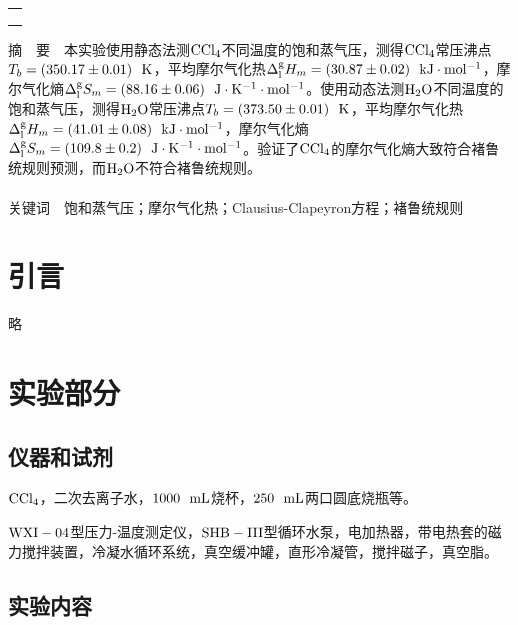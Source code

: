 \documentclass[12pt]{article}
\begin{document}
\begin{titlepage}
\begin{center}
            \begin{tabular*}{\textwidth}{c}
                \\ %
                \\ %
                \\ %
                \\ %
                \hline %
            \end{tabular*}
        \end{center}
        \textsf{摘\ \ 要}\ \ 本实验使用静态法测$\rm CCl_{4}$不同温度的饱和蒸气压，测得$\rm CCl_{4}$常压沸点$T_{b}=(350.17\pm 0.01)\ \ {\rm K}$，平均摩尔气化热$\Delta^{\rm g}_{\rm l}H_{m}=(30.87\pm 0.02)\ \ {\rm kJ\cdot mol^{-1}}$，摩尔气化熵$\Delta^{\rm g}_{\rm l}S_{m}=(88.16\pm 0.06)\ \ {\rm J\cdot K^{-1}\cdot mol^{-1}}$。使用动态法测$\rm H_{2}O$不同温度的饱和蒸气压，测得$\rm H_{2}O$常压沸点$T_{b}=(373.50\pm 0.01)\ \ {\rm K}$，平均摩尔气化热$\Delta^{\rm g}_{\rm l}H_{m}=(41.01\pm 0.08)\ \ {\rm kJ\cdot mol^{-1}}$，摩尔气化熵$\Delta^{\rm g}_{\rm l}S_{m}=(109.8\pm 0.2)\ \ {\rm J\cdot K^{-1}\cdot mol^{-1}}$。验证了$\rm CCl_{4}$的摩尔气化熵大致符合褚鲁统规则预测，而$\rm H_{2}O$不符合褚鲁统规则。
        \\
        \\
        \textsf{关键词}\ \ 饱和蒸气压；摩尔气化热；Clausius-Clapeyron方程；褚鲁统规则
    \end{titlepage}

    \section{引言}
	略
               
\vbox{}        
    \section{实验部分}
    	\subsection{仪器和试剂}
    	$\rm CCl_{4}$，二次去离子水，$1000\ \ {\rm mL}$烧杯，$250\ \ {\rm mL}$两口圆底烧瓶等。\par 
    	$\rm WXI-04$型压力-温度测定仪，$\rm SHB-III$型循环水泵，电加热器，带电热套的磁力搅拌装置，冷凝水循环系统，真空缓冲罐，直形冷凝管，搅拌磁子，真空脂。
     
\vbox{}
    	 \subsection{实验内容\citealp{physchemlab}}
\end{document}
